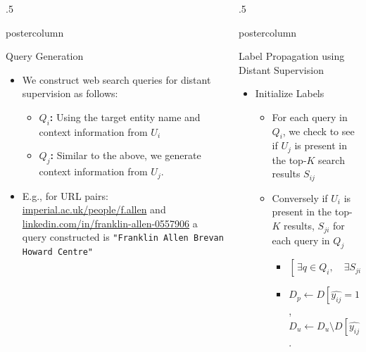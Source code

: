 \documentclass{beamer}
\newlength{\columnheight}
\begin{document}
\begin{frame}
\begin{columns}
\begin{column}{.5\textwidth}
\begin{beamercolorbox}[center]{postercolumn}
\begin{minipage}{.98\textwidth}
{         \begin{block}{Query Generation}
\begin{itemize}
\item We construct web search queries for distant supervision as follows:
\begin{itemize}
\item \textbf{$Q_i$:} Using the target entity name and context information from $U_{i}$
\item \textbf{$Q_j$:} Similar to the above, we generate context information from  $U_{j}$.
\end{itemize}
\item E.g., for URL pairs: {\color{blue} \small \url{imperial.ac.uk/people/f.allen}} and {\color{blue} \small \url{linkedin.com/in/franklin-allen-0557906}}
a query constructed is {\color{brown} \tt \small {"Franklin Allen Brevan Howard Centre"}}
\end{itemize}
\vspace{0.5em}
\end{block} \vfill
		}\end{minipage}\end{beamercolorbox}
	\end{column}
	\begin{column}{.5\textwidth}
		\begin{beamercolorbox}[center]{postercolumn}
			\begin{minipage}{.98\textwidth} %
				\parbox[t][\columnheight]{\textwidth}{ %



\begin{block}{Label Propagation using Distant Supervision}
\begin{itemize}
\item Initialize Labels
\begin{itemize}
\item For each query in $Q_i$, we check to see if $U_{j}$ is present in the top-$K$ search results $S_{ij}$
	\vspace{0.5em}
\item Conversely if $U_i$ is present in the top-$K$ results, $S_{ji}$ for each query in $Q_j$
	\vspace{0.7em}
\begin{itemize}
\item $[ \, \exists  q \in Q_i,  \quad \exists S_{ji} \mid U_j \in S_{ji} \lor \exists q \in Q_j,  \quad \exists S_{ij} \mid U_i \in S_{ij} ] \, \implies \hat{y_{ij}}=1$
	\vspace{0.7em}
\item $D_{p} \gets D[\hat{y_{ij}}=1]$, $D_{u} \gets D_{u} \setminus D[\hat{y_{ij}}=1]$.
\end{itemize}
\end{itemize}
\vspace{0.5em}


\end{itemize}
\end{block}}
\end{minipage}
\end{beamercolorbox}
\end{column}
\end{columns}
\end{frame}
\end{document}
